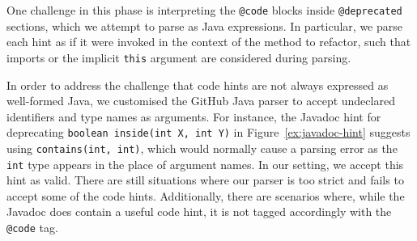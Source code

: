 \documentclass[sigconf]{acmart}
\begin{document}

One challenge in this phase is interpreting the
\lstinline[breaklines=true]{@code} blocks inside \lstinline[breaklines=true]{@deprecated} sections, which
we attempt to parse as Java expressions. In particular, we parse each hint as if it were invoked in the context of
the method to refactor, such that imports or the implicit \lstinline[breaklines=true]{this} argument
are considered during parsing.

%
In order to address the challenge that code hints are not always expressed as well-formed Java,
we customised the
GitHub Java parser
to accept undeclared identifiers and type names
as arguments. For instance, the Javadoc hint for deprecating \lstinline[breaklines=true]{boolean inside(int X, int Y)}
in Figure~\ref{ex:javadoc-hint} suggests using
\lstinline[breaklines=true]{contains(int, int)}, which would normally cause a parsing error as the \lstinline[breaklines=true]{int} type
appears in the place of argument names. In our setting, we accept this hint as valid.
There are still situations where our parser is too strict and fails to accept
some of the code hints. Additionally, there are scenarios where, while the Javadoc
does contain a useful code hint, it is not tagged accordingly with
the \lstinline[breaklines=true]{@code} tag. %


\end{document}
